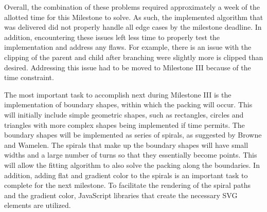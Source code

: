 \documentclass[12pt]{article}
\begin{document}
	Overall, the combination of these problems required approximately a week of the allotted time for this Milestone to solve. As such, the implemented algorithm that was delivered did not properly handle all edge cases by the milestone deadline. In addition, encountering these issues left less time to properly test the implementation and address any flaws. For example, there is an issue with the clipping of the parent and child after branching were slightly more is clipped than desired. Addressing this issue had to be moved to Milestone III because of the time constraint.
	
	The most important task to accomplish next during Milestone III is the implementation of boundary shapes, within which the packing will occur. This will initially include simple geometric shapes, such as rectangles, circles and triangles with more complex shapes being implemented if time permits. The boundary shapes will be implemented as series of spirals, as suggested by Browne and Wamelen.\cite{Browne2006834} The spirals that make up the boundary shapes will have small widths and a large number of turns so that they essentially become points. This will allow the fitting algorithm to also solve the packing along the boundaries. In addition, adding flat and gradient color to the spirals is an important task to complete for the next milestone. To facilitate the rendering of the spiral paths and the gradient color, JavaScript libraries that create the necessary SVG elements are utilized.
		
\begingroup
\renewcommand{\section}[2]{}%

{}
\endgroup
\end{document}
